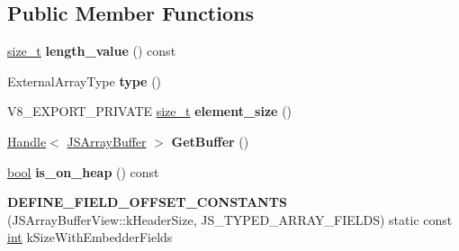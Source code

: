 \subsection*{Public Member Functions}
\begin{DoxyCompactItemize}
\item 
\mbox{\label{classv8_1_1internal_1_1JSTypedArray_ac20e6198a2029ca6b14340952630b6bc}} 
\mbox{\hyperlink{classsize__t}{size\+\_\+t}} {\bfseries length\+\_\+value} () const
\item 
\mbox{\label{classv8_1_1internal_1_1JSTypedArray_afde5c223fea09a38b96115093437b3c8}} 
External\+Array\+Type {\bfseries type} ()
\item 
\mbox{\label{classv8_1_1internal_1_1JSTypedArray_aac811bca8603d48ef4ea6366abebcaa6}} 
V8\+\_\+\+E\+X\+P\+O\+R\+T\+\_\+\+P\+R\+I\+V\+A\+TE \mbox{\hyperlink{classsize__t}{size\+\_\+t}} {\bfseries element\+\_\+size} ()
\item 
\mbox{\label{classv8_1_1internal_1_1JSTypedArray_a652f569a7f5248ef5990faa5682124d1}} 
\mbox{\hyperlink{classv8_1_1internal_1_1Handle}{Handle}}$<$ \mbox{\hyperlink{classv8_1_1internal_1_1JSArrayBuffer}{J\+S\+Array\+Buffer}} $>$ {\bfseries Get\+Buffer} ()
\item 
\mbox{\label{classv8_1_1internal_1_1JSTypedArray_af7169ae3b09b46d8dd0e695000f78c30}} 
\mbox{\hyperlink{classbool}{bool}} {\bfseries is\+\_\+on\+\_\+heap} () const
\item 
\mbox{\label{classv8_1_1internal_1_1JSTypedArray_a0f60e91cbd3603f35ab60d9d3683eb13}} 
{\bfseries D\+E\+F\+I\+N\+E\+\_\+\+F\+I\+E\+L\+D\+\_\+\+O\+F\+F\+S\+E\+T\+\_\+\+C\+O\+N\+S\+T\+A\+N\+TS} (J\+S\+Array\+Buffer\+View\+::k\+Header\+Size, J\+S\+\_\+\+T\+Y\+P\+E\+D\+\_\+\+A\+R\+R\+A\+Y\+\_\+\+F\+I\+E\+L\+DS) static const \mbox{\hyperlink{classint}{int}} k\+Size\+With\+Embedder\+Fields
\end{DoxyCompactItemize}
